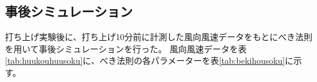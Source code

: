 \documentclass[a4paper,11pt,titlepage,uplatex]{jsarticle}
\begin{document}

\subsection{事後シミュレーション}
打ち上げ実験後に、打ち上げ10分前に計測した風向風速データをもとにべき法則を用いて事後シミュレーションを行った。
風向風速データを表\ref{tab:huukouhuusoku}に、べき法則の各パラメーターを表\ref{tab:bekihousoku}に示す。
\end{document}
